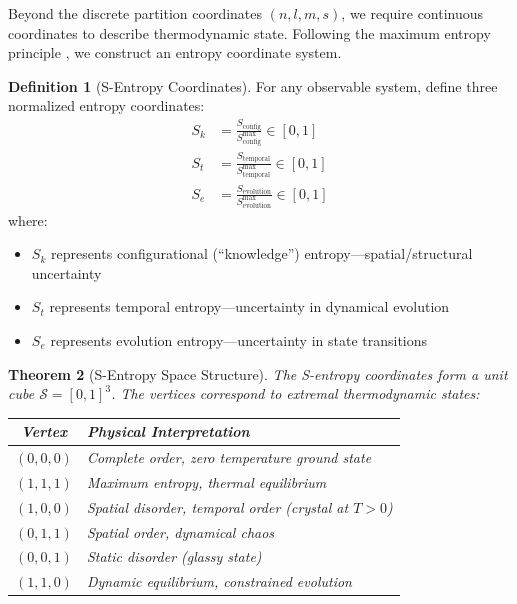 \documentclass[twocolumn,10pt,a4paper]{article}
\newtheorem{theorem}{Theorem}[section]
\theoremstyle{definition}
\newtheorem{definition}[theorem]{Definition}
\theoremstyle{remark}
\newcommand{\Sk}{S_k}
\newcommand{\St}{S_t}
\newcommand{\Se}{S_e}
\begin{document}
Beyond the discrete partition coordinates $(n, l, m, s)$, we require continuous coordinates to describe thermodynamic state. Following the maximum entropy principle \cite{jaynes1957}, we construct an entropy coordinate system.

\begin{definition}[S-Entropy Coordinates]
\label{def:sentropy}
For any observable system, define three normalized entropy coordinates:
\begin{align}
    \Sk &= \frac{S_{\text{config}}}{S_{\text{config}}^{\max}} \in [0,1] \\
    \St &= \frac{S_{\text{temporal}}}{S_{\text{temporal}}^{\max}} \in [0,1] \\
    \Se &= \frac{S_{\text{evolution}}}{S_{\text{evolution}}^{\max}} \in [0,1]
\end{align}
where:
\begin{itemize}
    \item $\Sk$ represents configurational (``knowledge'') entropy---spatial/structural uncertainty
    \item $\St$ represents temporal entropy---uncertainty in dynamical evolution
    \item $\Se$ represents evolution entropy---uncertainty in state transitions
\end{itemize}
\end{definition}

\begin{theorem}[S-Entropy Space Structure]
The S-entropy coordinates form a unit cube $\mathcal{S} = [0,1]^3$. The vertices correspond to extremal thermodynamic states:
\begin{center}
\begin{tabular}{cl}
\toprule
Vertex & Physical Interpretation \\
\midrule
$(0,0,0)$ & Complete order, zero temperature ground state \\
$(1,1,1)$ & Maximum entropy, thermal equilibrium \\
$(1,0,0)$ & Spatial disorder, temporal order (crystal at $T > 0$) \\
$(0,1,1)$ & Spatial order, dynamical chaos \\
$(0,0,1)$ & Static disorder (glassy state) \\
$(1,1,0)$ & Dynamic equilibrium, constrained evolution \\
\bottomrule
\end{tabular}
\end{center}
\end{theorem}
\end{document}
